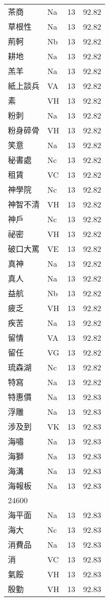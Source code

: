 \documentclass[twocolumn]{book}
\begin{document}
\begin{supertabular}{llrr}
茶商 & Na & 13 &  92.82\\
草根性 & Na & 13 &  92.82\\
荊軻 & Nb & 13 &  92.82\\
耕地 & Na & 13 &  92.82\\
羔羊 & Na & 13 &  92.82\\
紙上談兵 & VA & 13 &  92.82\\
素 & VH & 13 &  92.82\\
粉刺 & Na & 13 &  92.82\\
粉身碎骨 & VH & 13 &  92.82\\
笑意 & Na & 13 &  92.82\\
秘書處 & Nc & 13 &  92.82\\
租賃 & VC & 13 &  92.82\\
神學院 & Nc & 13 &  92.82\\
神智不清 & VH & 13 &  92.82\\
神戶 & Nc & 13 &  92.82\\
祕密 & VH & 13 &  92.82\\
破口大罵 & VE & 13 &  92.82\\
真神 & Na & 13 &  92.82\\
真人 & Na & 13 &  92.82\\
益航 & Nb & 13 &  92.82\\
疲乏 & VH & 13 &  92.82\\
疾苦 & Na & 13 &  92.82\\
留情 & VA & 13 &  92.82\\
留任 & VG & 13 &  92.82\\
琉森湖 & Nc & 13 &  92.82\\
特寫 & Na & 13 &  92.82\\
特惠價 & Na & 13 &  92.83\\
浮雕 & Na & 13 &  92.83\\
涉及到 & VK & 13 &  92.83\\
海嘯 & Na & 13 &  92.83\\
海獅 & Na & 13 &  92.83\\
海溝 & Na & 13 &  92.83\\
海報板 & Na & 13 &  92.83\\
24600\\
海平面 & Na & 13 &  92.83\\
海大 & Nc & 13 &  92.83\\
消費品 & Na & 13 &  92.83\\
消 & VC & 13 &  92.83\\
氣餒 & VH & 13 &  92.83\\
殷勤 & VH & 13 &  92.83\\

\end{supertabular}
\end{document}
